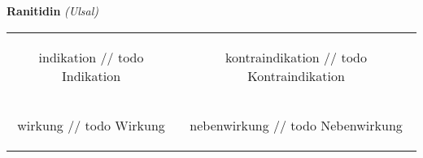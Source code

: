 \documentclass[12pt]{beamer}
\begin{document}
\begin{frame}{
    \textbf{Ranitidin}
    \textit{(Ulsal)}
}
    \begin{tabular}{c c}
        \begin{beamercolorbox}[wd=\boxwidth\textwidth,ht=\boxheight\textheight,sep=1em]{indikation}
        // todo Indikation
        \end{beamercolorbox} & 
        \begin{beamercolorbox}[wd=\boxwidth\textwidth,ht=\boxheight\textheight,sep=1em]{kontraindikation}
        // todo Kontraindikation 
        \end{beamercolorbox} \\
        \begin{beamercolorbox}[wd=\boxwidth\textwidth,ht=\boxheight\textheight,sep=1em]{wirkung}
        // todo Wirkung
        \end{beamercolorbox} & 
        \begin{beamercolorbox}[wd=\boxwidth\textwidth,ht=\boxheight\textheight,sep=1em]{nebenwirkung}
        // todo Nebenwirkung
        \end{beamercolorbox} \\
    \end{tabular}
\end{frame}
\end{document}
